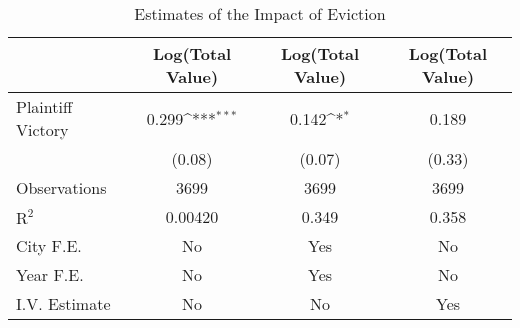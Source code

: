 \begin{table}[htbp]\centering
\def\sym#1{\ifmmode^{#1}\else\(^{#1}\)\fi}
\caption{Estimates of the Impact of Eviction}
\begin{tabular}{l*{3}{c}}
\toprule
                    &\multicolumn{1}{c}{Log(Total Value)}&\multicolumn{1}{c}{Log(Total Value)}&\multicolumn{1}{c}{Log(Total Value)}\\
\midrule
Plaintiff Victory   &       0.299\sym{***}&       0.142\sym{*}  &       0.189         \\
                    &      (0.08)         &      (0.07)         &      (0.33)         \\
\midrule
Observations        &        3699         &        3699         &        3699         \\
$\text{R}^2$        &     0.00420         &       0.349         &       0.358         \\
City F.E.           &          No         &         Yes         &          No         \\
Year F.E.           &          No         &         Yes         &          No         \\
I.V. Estimate       &          No         &          No         &         Yes         \\
\bottomrule
\end{tabular}
\end{table}
